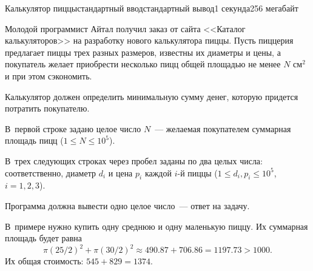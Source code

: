\begin{problem}{Калькулятор пиццы}{стандартный ввод}{стандартный вывод}{1 секунда}{256 мегабайт}

Молодой программист Айтал получил заказ от сайта <<Каталог калькуляторов>> на разработку нового калькулятора пиццы. Пусть пиццерия предлагает пиццы трех разных размеров, известны их диаметры и цены, а покупатель желает приобрести несколько пицц общей площадью не менее $N$ $\mbox{см}^2$ и при этом сэкономить.

Калькулятор должен определить минимальную сумму денег, которую придется потратить покупателю.

\InputFile
В~первой строке задано целое число $N$~--- желаемая покупателем суммарная площадь пицц ($1 \leq N \leq 10^5$).

В~трех следующих строках через пробел заданы по два целых числа: соответственно, диаметр $d_i$ и цена $p_i$ каждой $i$-й пиццы ($1 \leq d_i, p_i \leq 10^5$, $i = 1, 2, 3$).

\OutputFile
Программа должна вывести одно целое число~--- ответ на задачу.

\Example

\begin{example}
%
\end{example}

\Note
В~примере нужно купить одну среднюю и одну маленькую пиццу. Их суммарная площадь будет равна 
$$\pi(25/2)^2 + \pi(30/2)^2 \approx 490.87 + 706.86 = 1197.73 > 1000.$$ Их общая стоимость: $545 + 829 = 1374$.

\end{problem}

